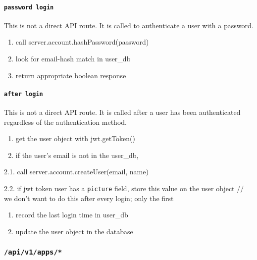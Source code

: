 \hypertarget{password-login}{%
\paragraph{\texorpdfstring{\texttt{password\ login}}{password login}}\label{password-login}}

This is not a direct API route. It is called to authenticate a user with
a password.

\begin{enumerate}
\def\labelenumi{\arabic{enumi}.}
\item
  call server.account.hashPassword(password)
\item
  look for email-hash match in user\_db
\item
  return appropriate boolean response
\end{enumerate}

\hypertarget{after-login}{%
\paragraph{\texorpdfstring{\texttt{after\ login}}{after login}}\label{after-login}}

This is not a direct API route. It is called after a user has been
authenticated regardless of the authentication method.

\begin{enumerate}
\def\labelenumi{\arabic{enumi}.}
\item
  get the user object with jwt.getToken()
\item
  if the user's email is not in the user\_db,
\end{enumerate}

2.1. call server.account.createUser(email, name)

2.2. if jwt token user has a \texttt{picture} field, store this value on
the user object // we don't want to do this after every login; only the
first

\begin{enumerate}
\def\labelenumi{\arabic{enumi}.}
\setcounter{enumi}{2}
\item
  record the last login time in user\_db
\item
  update the user object in the database
\end{enumerate}

\hypertarget{apiv1apps}{%
\subsubsection{\texorpdfstring{\texttt{/api/v1/apps/*}}{/api/v1/apps/*}}\label{apiv1apps}}

